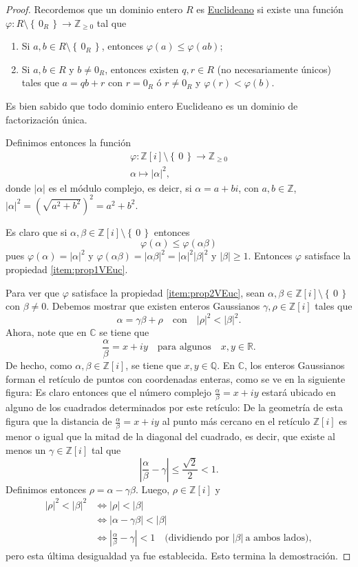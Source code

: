 \documentclass{amsbook}
\renewcommand{\.}{\cdot}
\renewcommand{\:}{\colon}               %
\newcommand{\bC}{\mathbb{C}}    %
\newcommand{\bQ}{\mathbb{Q}}    %
\newcommand{\bR}{\mathbb{R}}    %
\newcommand{\bZ}{\mathbb{Z}}    %
\newcommand{\set}[1]{\left\{\,#1\,\right\}}    %
\newcommand{\word}[1]{\quad\mbox{#1}\quad} %
\newcommand{\al}{\alpha}                %
\newcommand{\bt}{\beta}                 %
\newcommand{\ga}{\gamma}                %
\newcommand{\vf}{\varphi}               %
\newcommand{\un}{\underline}       %
\newcommand{\term}[1]{\un{#1}\index{#1}}
\theoremstyle{plain}
\theoremstyle{definition}
\theoremstyle{remark}
\numberwithin{equation}{section}
\begin{document}
\begin{proof}
    Recordemos que un dominio entero $R$ es \term{Euclideano} si existe una función $\vf\:R\setminus\set{0_R}\to\bZ_{\geq0}$ tal que 
    \begin{enumerate}[label=(\roman*)]
        \item \label{item:prop1VEuc} Si $a,b\in R\setminus\set{0_R}$, entonces $\vf(a)\leq\vf(ab)$;
        \item \label{item:prop2VEuc}Si $a,b\in R$ y $b\neq0_R$, entonces existen $q,r\in R$ (no necesariamente únicos) tales que $a=qb+r$ con $r=0_R$ ó $r\neq 0_R$ y $\vf(r)<\vf(b)$.
    \end{enumerate}
    Es bien sabido que todo dominio entero Euclideano es un dominio de factorización única.\par 
    Definimos entonces la función 
    \begin{gather*}
        \vf\:\bZ[i]\setminus\set{0}\to\bZ_{\geq 0}\\
        \al\mapsto|\al|^2,   
    \end{gather*}
    donde $|\al|$ es el módulo complejo, es deicr, si $\al=a+bi$, con $a,b\in\bZ$, $|\al|^2=(\sqrt{a^2+b^2})^2=a^2+b^2$.\par 
    Es claro que si $\al,\bt\in\bZ[i]\setminus\set{0}$ entonces
    $$\vf(\al)\leq\vf(\al\bt)$$
    pues $\vf(\al)=|\al|^2$ y $\vf(\al\bt)=|\al\bt|^2=|\al|^2|\bt|^2$ y $|\bt|\geq 1$. Entonces $\vf$ satisface la propiedad \ref{item:prop1VEuc}.\par 
    Para ver que $\vf$ satisface la propiedad \ref{item:prop2VEuc}, sean $\al,\bt\in\bZ[i]\setminus\set{0}$ con $\bt\neq 0$. Debemos mostrar que existen enteros Gaussianos $\ga,\rho\in\bZ[i]$ tales que
    $$\al=\ga\bt+\rho\word{con}|\rho|^2<|\bt|^2.$$
    Ahora, note que en $\bC$ se tiene que 
    $$\frac{\al}{\bt}=x+iy\word{para algunos}x,y\in\bR.$$
    De hecho, como $\al,\bt\in\bZ[i]$, se tiene que $x,y\in\bQ$. En $\bC$, los enteros Gaussianos forman el retículo de puntos con coordenadas enteras, como se ve en la siguiente figura:
    Es claro entonces que el número complejo $\frac{\al}{\bt}=x+iy$ estará ubicado en alguno de los cuadrados determinados por este retículo:
    De la geometría de esta figura %
    que la distancia de $\frac{\al}{\bt}=x+iy$ al punto más cercano en el retículo $\bZ[i]$ es menor o igual que la mitad de la diagonal del cuadrado, es decir, que existe al menos un $\ga\in\bZ[i]$ tal que 
    $$\left|\frac{\al}{\bt}-\ga\right|\leq\frac{\sqrt{2}}{2}<1.$$
    Definimos entonces $\rho=\al-\ga\bt$. Luego, $\rho\in\bZ[i]$ y 
    \begin{align*}
        |\rho|^2<|\bt|^2&\iff|\rho|<|\bt|\\
        &\iff|\al-\ga\bt|<|\bt|\\
        &\iff\left|\frac{\al}{\bt}-\ga\right|<1\quad\text{(dividiendo por }|\bt|\ \text{a ambos lados)},
    \end{align*}
    pero esta última desigualdad ya fue establecida. Esto termina la demostración.
\end{proof}
\end{document}
